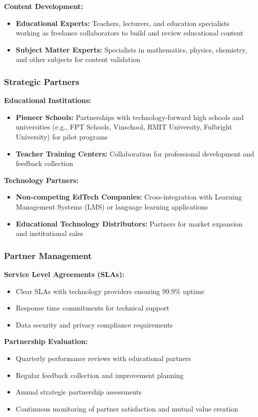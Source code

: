 \textbf{Content Development:}
\begin{itemize}
    \item \textbf{Educational Experts:} Teachers, lecturers, and education specialists working as freelance collaborators to build and review educational content
    \item \textbf{Subject Matter Experts:} Specialists in mathematics, physics, chemistry, and other subjects for content validation
\end{itemize}

\subsubsection{Strategic Partners}
\textbf{Educational Institutions:}
\begin{itemize}
    \item \textbf{Pioneer Schools:} Partnerships with technology-forward high schools and universities (e.g., FPT Schools, Vinschool, RMIT University, Fulbright University) for pilot programs
    \item \textbf{Teacher Training Centers:} Collaboration for professional development and feedback collection
\end{itemize}

\textbf{Technology Partners:}
\begin{itemize}
    \item \textbf{Non-competing EdTech Companies:} Cross-integration with Learning Management Systems (LMS) or language learning applications
    \item \textbf{Educational Technology Distributors:} Partners for market expansion and institutional sales
\end{itemize}

\subsubsection{Partner Management}
\textbf{Service Level Agreements (SLAs):}
\begin{itemize}
    \item Clear SLAs with technology providers ensuring 99.9\% uptime
    \item Response time commitments for technical support
    \item Data security and privacy compliance requirements
\end{itemize}

\textbf{Partnership Evaluation:}
\begin{itemize}
    \item Quarterly performance reviews with educational partners
    \item Regular feedback collection and improvement planning
    \item Annual strategic partnership assessments
    \item Continuous monitoring of partner satisfaction and mutual value creation
\end{itemize}